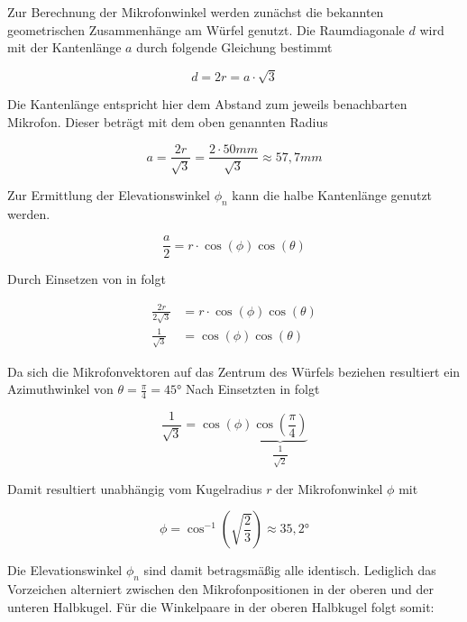 Zur Berechnung der Mikrofonwinkel werden zunächst die bekannten geometrischen Zusammenhänge am Würfel genutzt. Die Raumdiagonale $d$ wird mit der Kantenlänge $a$ durch folgende Gleichung bestimmt

\begin{equation}
    d = 2r = a\cdot \sqrt{3}
\end{equation}

Die Kantenlänge entspricht hier dem Abstand zum jeweils benachbarten Mikrofon. Dieser beträgt mit dem oben genannten Radius

\begin{equation}\label{eq:Mikrofonwinkel_1}
    a = \frac{2r}{\sqrt{3}} = \frac{2 \cdot 50 mm}{\sqrt{3}} \approx 57,7 mm 
\end{equation}

Zur Ermittlung der Elevationswinkel $\phi_n$ kann die halbe Kantenlänge genutzt werden.

\begin{equation}\label{eq:Mikrofonwinkel_2}
    \frac{a}{2} = r\cdot \cos{(\phi)} \cos{(\theta)}
\end{equation}

Durch Einsetzen von  in  folgt

\begin{align}\label{eq:Mikrofonwinkel_2}
    \frac{2r}{2\sqrt{3}} & = r\cdot \cos{(\phi)} \cos{(\theta)} \\
    \frac{1}{\sqrt{3}}   & = \cos{(\phi)} \cos{(\theta)}      
\end{align}


Da sich die Mikrofonvektoren auf das Zentrum des Würfels beziehen resultiert ein Azimuthwinkel von $\theta = \frac{\pi}{4} = 45°$ Nach Einsetzten in  folgt

\begin{equation}
     \frac{1}{\sqrt{3}} = \cos{(\phi)} \underbrace{\cos{\left(\frac{\pi}{4} \right)}}_{\dfrac{1}{\sqrt{2}}}   
\end{equation}

Damit resultiert unabhängig vom Kugelradius $r$ der Mikrofonwinkel $\phi$ mit

\begin{equation}
\phi = \cos^{-1}{\left( \sqrt{\frac{2}{3}} \right)}  \approx 35,2°
\end{equation}

Die Elevationswinkel $\phi_n$ sind damit betragsmäßig alle identisch. Lediglich das Vorzeichen alterniert zwischen den Mikrofonpositionen in der oberen und der unteren Halbkugel. Für die Winkelpaare in der oberen Halbkugel folgt somit:


